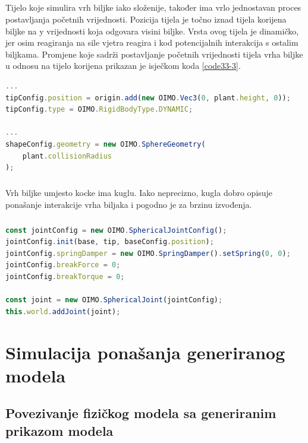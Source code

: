 \documentclass[times, utf8, diplomski]{fer}
\begin{document}
\paragraph{}
Tijelo koje simulira vrh biljke iako složenije, također ima vrlo jednostavan proces 
postavljanja početnih vrijednosti. Pozicija tijela je točno iznad tijela korijena biljke na
y vrijednosti koja odgovara visini biljke. Vrsta ovog tijela je dinamičko, jer osim 
reagiranja na sile vjetra reagira i kod potencijalnih interakcija s ostalim biljkama. 
Promjene koje sadrži postavljanje početnih vrijednosti tijela vrha biljke u odnosu na tijelo 
korijena prikazan je isječkom koda \ref{code33-3}.

\begin{lstlisting}[language=Javascript,label=code33-3,caption=Postavljanje tijela vrha biljke]
...
tipConfig.position = origin.add(new OIMO.Vec3(0, plant.height, 0));
tipConfig.type = OIMO.RigidBodyType.DYNAMIC;

...
shapeConfig.geometry = new OIMO.SphereGeometry(
	plant.collisionRadius
);
\end{lstlisting}

\paragraph{}
Vrh biljke umjesto kocke ima kuglu. Iako neprecizno, kugla dobro opisuje ponašanje 	
interakcije vrha biljaka i pogodno je za brzinu izvođenja.

\paragraph{}

\begin{lstlisting}[language=Javascript,label=code33-4,caption=Postavljanje kuglastog zgloba]
const jointConfig = new OIMO.SphericalJointConfig();
jointConfig.init(base, tip, baseConfig.position);
jointConfig.springDamper = new OIMO.SpringDamper().setSpring(0, 0);
jointConfig.breakForce = 0;
jointConfig.breakTorque = 0;

const joint = new OIMO.SphericalJoint(jointConfig);
this.world.addJoint(joint);
\end{lstlisting}


\chapter{Simulacija ponašanja generiranog modela}
\section{Povezivanje fizičkog modela sa generiranim prikazom modela}
\end{document}
